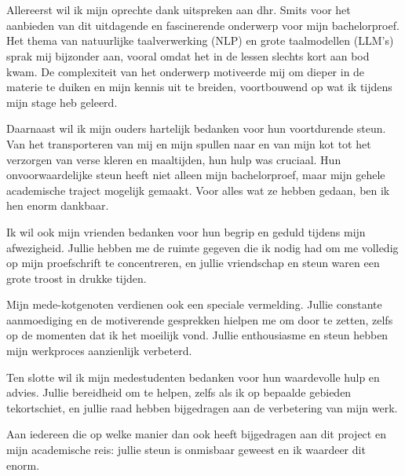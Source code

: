 
\chapter*{}%
\label{ch:voorwoord}
Allereerst wil ik mijn oprechte dank uitspreken aan dhr. Smits voor het aanbieden van dit uitdagende en fascinerende onderwerp voor mijn bachelorproef. Het thema van natuurlijke taalverwerking (NLP) en grote taalmodellen (LLM's) sprak mij bijzonder aan, vooral omdat het in de lessen slechts kort aan bod kwam. De complexiteit van het onderwerp motiveerde mij om dieper in de materie te duiken en mijn kennis uit te breiden, voortbouwend op wat ik tijdens mijn stage heb geleerd.

Daarnaast wil ik mijn ouders hartelijk bedanken voor hun voortdurende steun. Van het transporteren van mij en mijn spullen naar en van mijn kot tot het verzorgen van verse kleren en maaltijden, hun hulp was cruciaal. Hun onvoorwaardelijke steun heeft niet alleen mijn bachelorproef, maar mijn gehele academische traject mogelijk gemaakt. Voor alles wat ze hebben gedaan, ben ik hen enorm dankbaar.

Ik wil ook mijn vrienden bedanken voor hun begrip en geduld tijdens mijn afwezigheid. Jullie hebben me de ruimte gegeven die ik nodig had om me volledig op mijn proefschrift te concentreren, en jullie vriendschap en steun waren een grote troost in drukke tijden.

Mijn mede-kotgenoten verdienen ook een speciale vermelding. Jullie constante aanmoediging en de motiverende gesprekken hielpen me om door te zetten, zelfs op de momenten dat ik het moeilijk vond. Jullie enthousiasme en steun hebben mijn werkproces aanzienlijk verbeterd.

Ten slotte wil ik mijn medestudenten bedanken voor hun waardevolle hulp en advies. Jullie bereidheid om te helpen, zelfs als ik op bepaalde gebieden tekortschiet, en jullie raad hebben bijgedragen aan de verbetering van mijn werk. 

Aan iedereen die op welke manier dan ook heeft bijgedragen aan dit project en mijn academische reis: jullie steun is onmisbaar geweest en ik waardeer dit enorm.


